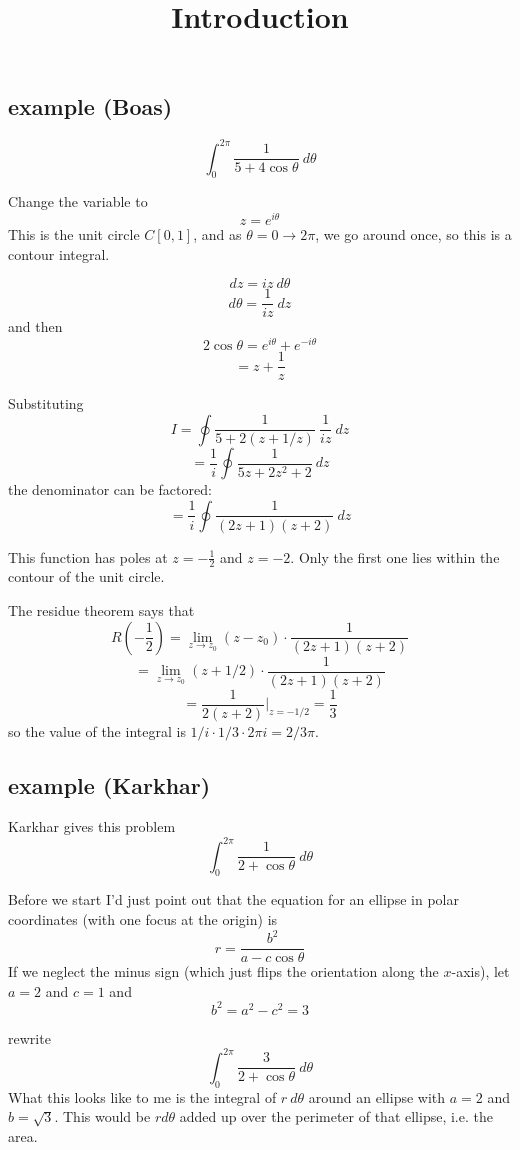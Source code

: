 \documentclass[11pt, oneside]{article}
\title{Introduction}
\date{}
\begin{document}
\maketitle
\Large


\subsection*{example (Boas)}
\[ \int_0^{2 \pi} \frac{1}{5 + 4 \cos \theta} \ d \theta \]

Change the variable to
\[ z = e^{i \theta} \]
This is the unit circle $C[0,1]$, and as $\theta = 0 \rightarrow 2 \pi$, we go around once, so this is a contour integral.

\[ dz = i z \ d \theta \]
\[ d \theta = \frac{1}{iz} \ dz \]
and then
\[ 2 \cos \theta = e^{i \theta} + e^{- i \theta} \]
\[ = z + \frac{1}{z} \]

Substituting
\[ I = \oint \frac{1}{5 + 2(z + 1/z)} \ \frac{1}{iz} \ dz \]
\[ = \frac{1}{i} \oint \frac{1}{5z + 2z^2 + 2} \ dz \]
the denominator can be factored:
\[ = \frac{1}{i} \oint \frac{1}{(2z + 1)(z + 2)} \ dz \]

This function has poles at $z = -\frac{1}{2}$ and $z = -2$.  Only the first one lies within the contour of the unit circle.

The residue theorem says that
\[ R(-\frac{1}{2}) = \lim_{z \rightarrow z_0} (z - z_0) \cdot \frac{1}{(2z + 1)(z + 2)} \]
\[ = \lim_{z \rightarrow z_0} (z + 1/2) \cdot \frac{1}{(2z + 1)(z + 2)} \]
\[ = \frac{1}{2(z + 2)} \bigg |_{z = -1/2} = \frac{1}{3} \]
so the value of the integral is $1/i \cdot 1/3 \cdot 2 \pi i = 2/3 \pi$.

\subsection*{example (Karkhar)}

Karkhar gives this problem
\[ \int_0^{2\pi} \frac{1}{2 + \cos \theta} \ d \theta \]

Before we start I'd just point out that the equation for an ellipse in polar coordinates (with one focus at the origin) is
\[ r = \frac{b^2}{a - c \cos \theta} \]
If we neglect the minus sign (which just flips the orientation along the $x$-axis), let $a=2$ and $c=1$ and
\[ b^2 = a^2 - c^2 = 3 \]

rewrite
\[ \int_0^{2\pi} \frac{3}{2 + \cos \theta} \ d \theta \]
What this looks like to me is the integral of $r \ d \theta$ around an ellipse with $a = 2$ and $b = \sqrt{3}$.  This would be $r d \theta$ added up over the perimeter of that ellipse, i.e. the area.
\end{document}
